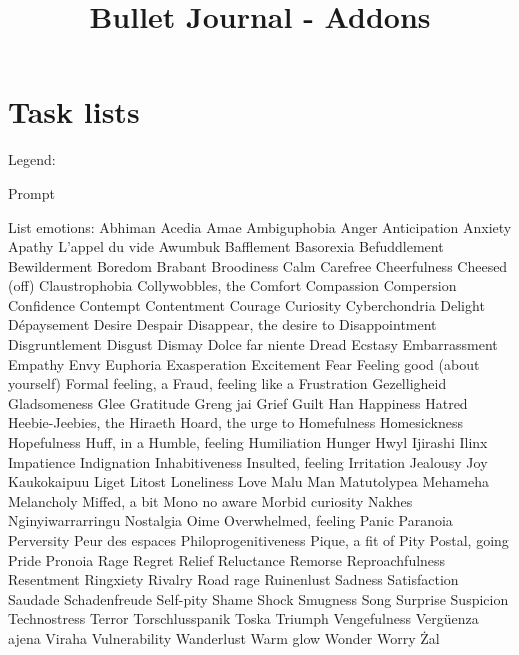 \documentclass[a4paper]{article}
\title{Bullet Journal - Addons}
\begin{document}
\maketitle
\tableofcontents
\newpage
\section{Task lists}
Legend:
\begin{itemize}
	 [+] Prompt 
\end{itemize}
\newpage
List emotions:
	 Abhiman
	 Acedia
	 Amae
	 Ambiguphobia
	 Anger
	 Anticipation
	 Anxiety
	 Apathy
	 L’appel du vide
	 Awumbuk
	 Bafflement
	 Basorexia
	 Befuddlement
	 Bewilderment
	 Boredom
	 Brabant
	 Broodiness
	 Calm
	 Carefree
	 Cheerfulness
	 Cheesed (off)
	 Claustrophobia
	 Collywobbles, the
	 Comfort
	 Compassion
	 Compersion
	 Confidence
	 Contempt
	 Contentment
	 Courage
	 Curiosity
	 Cyberchondria
	 Delight
	 Dépaysement
	 Desire
	 Despair
	 Disappear, the desire to
	 Disappointment
	 Disgruntlement
	 Disgust
	 Dismay
	 Dolce far niente
	 Dread
	 Ecstasy
	 Embarrassment
	 Empathy
	 Envy
	 Euphoria
	 Exasperation
	 Excitement
	 Fear
	 Feeling good (about yourself)
	 Formal feeling, a
	 Fraud, feeling like a
	 Frustration
	 Gezelligheid
	 Gladsomeness
	 Glee
	 Gratitude
	 Greng jai
	 Grief
	 Guilt
	 Han
	 Happiness
	 Hatred
	 Heebie-Jeebies, the
	 Hiraeth
	 Hoard, the urge to
	 Homefulness
	 Homesickness
	 Hopefulness
	 Huff, in a
	 Humble, feeling
	 Humiliation
	 Hunger
	 Hwyl
	 Ijirashi
	 Ilinx
	 Impatience
	 Indignation
	 Inhabitiveness
	 Insulted, feeling
	 Irritation
	 Jealousy
	 Joy
	 Kaukokaipuu
	 Liget
	 Litost
	 Loneliness
	 Love
	 Malu
	 Man
	 Matutolypea
	 Mehameha
	 Melancholy
	 Miffed, a bit
	 Mono no aware
	 Morbid curiosity
	 Nakhes
	 Nginyiwarrarringu
	 Nostalgia
	 Oime
	 Overwhelmed, feeling
	 Panic
	 Paranoia
	 Perversity
	 Peur des espaces
	 Philoprogenitiveness
	 Pique, a fit of
	 Pity
	 Postal, going
	 Pride
	 Pronoia
	 Rage
	 Regret
	 Relief
	 Reluctance
	 Remorse
	 Reproachfulness
	 Resentment
	 Ringxiety
	 Rivalry
	 Road rage
	 Ruinenlust
	 Sadness
	 Satisfaction
	 Saudade
	 Schadenfreude
   Self-pity
	 Shame
	 Shock
	 Smugness
	 Song
	 Surprise
	 Suspicion
	 Technostress
	 Terror
	 Torschlusspanik
	 Toska
	 Triumph
	 Vengefulness
	 Vergüenza ajena
	 Viraha
	 Vulnerability
	 Wanderlust
 	 Warm glow
	 Wonder
	 Worry
	 Żal
\newpage
\end{document}
